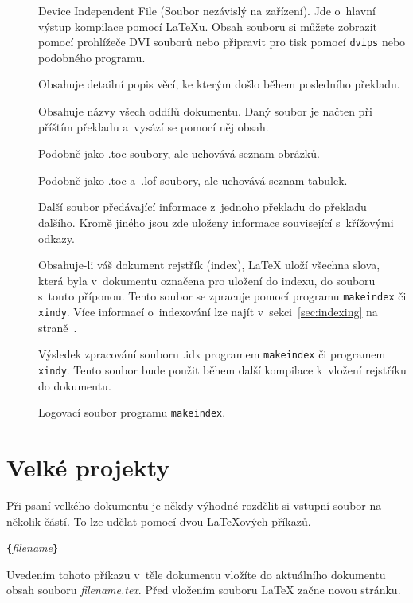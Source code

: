 \begin{description}
\item[] Device Independent File (Soubor nezávislý na zařízení).
  Jde o~hlavní výstup kompilace pomocí \LaTeX u. Obsah souboru si
  můžete zobrazit pomocí prohlížeče DVI souborů nebo připravit
  pro tisk pomocí \texttt{dvips} nebo podobného programu.
\item[] Obsahuje detailní popis věcí, ke kterým došlo během
  posledního překladu.
\item[] Obsahuje názvy všech oddílů dokumentu. Daný soubor je
  načten při příštím překladu a~vysází se pomocí něj obsah.
\item[] Podobně jako .toc soubory, ale uchovává seznam obrázků.
\item[] Podobně jako .toc a~.lof soubory, ale uchovává seznam tabulek.
\item[] Další soubor předávající informace z~jednoho překladu do
  překladu dal\-ší\-ho. Kromě jiného jsou zde uloženy informace související
s~křížovými odkazy.
\item[] Obsahuje-li váš dokument rejstřík (index), \LaTeX{} uloží všechna
  slova, která byla v~dokumentu označena pro uložení do indexu, do souboru
  s~touto příponou. Tento soubor se zpracuje pomocí programu
  \texttt{makeindex} či \texttt{xindy}. Více informací o~indexování lze najít
  v~sekci~\ref{sec:indexing} na straně~\pageref{sec:indexing}.
\item[] Výsledek zpracování souboru .idx programem \texttt{makeindex} či programem \texttt{xindy}.
  Tento soubor bude použit během další kompilace k~vložení rejstříku
  do dokumentu.
\item[] Logovací soubor programu \texttt{makeindex}.
\end{description}


%
%



%

\section{Velké projekty}
Při psaní velkého dokumentu je někdy výhodné rozdělit si vstupní
soubor na několik částí. To lze udělat pomocí dvou \LaTeX ových
příkazů.

\begin{lscommand}
\verb|{|\emph{filename}\verb|}|
\end{lscommand}
\noindent Uvedením tohoto příkazu v~těle dokumentu vložíte do aktuálního
dokumentu obsah souboru \emph{filename.tex}. Před vložením souboru \LaTeX{} začne 
novou stránku.

